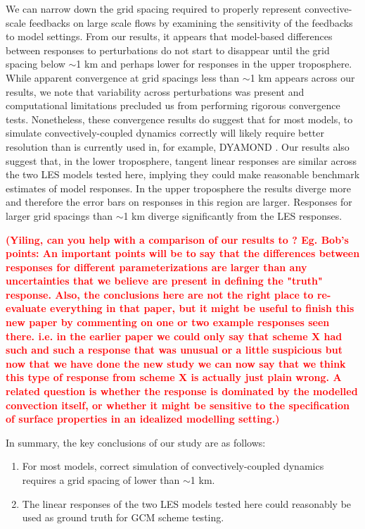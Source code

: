 \documentclass[draft]{agujournal2019}
\newcommand{\todo}[1]{\textcolor{red}{\textbf{(#1)}}}
\begin{document}
We can narrow down the grid spacing required to properly represent
convective-scale feedbacks on large scale flows by examining the sensitivity of
the feedbacks to model settings. From our results, it appears that model-based
differences between responses to perturbations do not start to disappear until
the grid spacing below $\sim$1 km and perhaps lower for responses in the upper
troposphere. While apparent convergence at grid spacings less than $\sim$1 km
appears across our results, we note that variability across perturbations was
present and computational limitations precluded us from performing rigorous
convergence tests. Nonetheless, these convergence results do suggest that for
most models, to simulate convectively-coupled dynamics correctly will likely
require better resolution than is currently used in, for example, DYAMOND
\cite{Stevens_PEPS_2019}. Our results also suggest that, in the lower
troposphere, tangent linear responses are similar across the two LES models
tested here, implying they could make reasonable benchmark estimates of model
responses. In the upper troposphere the results diverge more and therefore the
error bars on responses in this region are larger. Responses for larger grid
spacings than $\sim$1 km diverge significantly from the LES responses.

\todo{Yiling, can you help with a comparison of our results to
\citeA{Hwong_JAMES_2021}? Eg. Bob's points: An important points will be to say
that the differences between responses for different parameterizations are
larger than any uncertainties that we believe are present in defining the
"truth" response. Also, the conclusions here are not the right place to
re-evaluate everything in that paper, but it might be useful to finish this new
paper by commenting on one or two example responses seen there. i.e. in the
earlier paper we could only say that scheme X had such and such a response that
was unusual or a little suspicious but now that we have done the new study we
can now say that we think this type of response from scheme X is actually just
plain wrong. A related question is whether the response is dominated by the
modelled convection itself, or whether it might be sensitive to the
specification of surface properties in an idealized modelling setting.}

In summary, the key conclusions of our study are as follows:

\begin{enumerate}
    \item For most models, correct simulation of convectively-coupled dynamics
    requires a grid spacing of lower than $\sim$1 km.
    \item The linear responses of the two LES models tested here could
    reasonably be used as ground truth for GCM scheme testing.
\end{enumerate}
\end{document}
